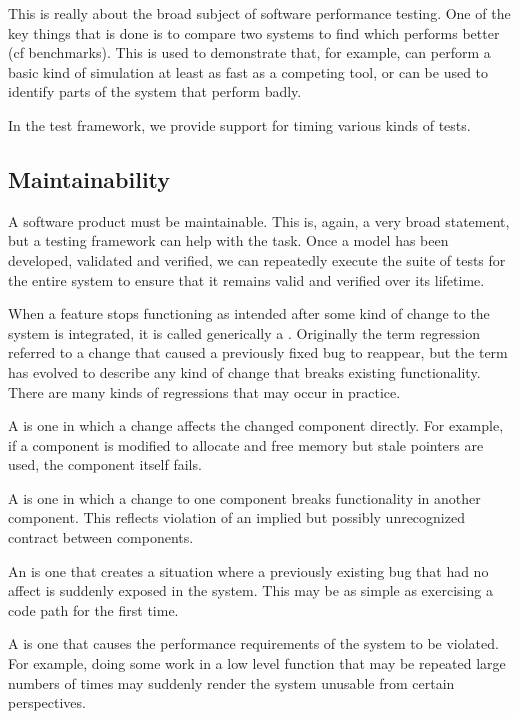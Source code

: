 \documentclass[letterpaper,10pt,english]{sphinxmanual}
\begin{document}
This is really about the broad subject of software performance testing.  One of
the key things that is done is to compare two systems to find which performs
better (cf benchmarks).  This is used to demonstrate that, for example,
 can perform a basic kind of simulation at least as fast as a
competing tool, or can be used to identify parts of the system that perform
badly.

In the  test framework, we provide support for timing various kinds
of tests.


\subsection{Maintainability}
\label{\detokenize{test-background:maintainability}}
A software product must be maintainable.  This is, again, a very broad
statement, but a testing framework can help with the task.  Once a model has
been developed, validated and verified, we can repeatedly execute the suite
of tests for the entire system to ensure that it remains valid and verified
over its lifetime.

When a feature stops functioning as intended after some kind of change to the
system is integrated, it is called generically a .
Originally the
term regression referred to a change that caused a previously fixed bug to
reappear, but the term has evolved to describe any kind of change that breaks
existing functionality.  There are many kinds of regressions that may occur
in practice.

A  is one in which a change affects the changed component
directly.  For example, if a component is modified to allocate and free memory
but stale pointers are used, the component itself fails.

A  is one in which a change to one component breaks
functionality in another component.  This reflects violation of an implied but
possibly unrecognized contract between components.

An  is one that creates a situation where a previously
existing bug that had no affect is suddenly exposed in the system.  This may
be as simple as exercising a code path for the first time.

A  is one that causes the performance requirements
of the system to be violated.  For example, doing some work in a low level
function that may be repeated large numbers of times may suddenly render the
system unusable from certain perspectives.
\end{document}
